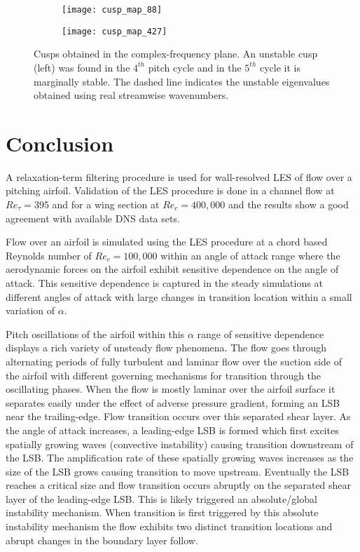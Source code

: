 \begin{figure}
	\centering
	\begin{subfigure}[t]{0.48\textwidth}
		\centering
		\texttt{[image: cusp\_map\_88]}
	\end{subfigure}
	\begin{subfigure}[t]{0.48\textwidth}
		\centering
		\texttt{[image: cusp\_map\_427]}
	\end{subfigure}
	\caption{Cusps obtained in the complex-frequency plane. An unstable cusp (left) was found in the $4^{th}$ pitch cycle and in the $5^{th}$ cycle it is marginally stable. The dashed line indicates the unstable eigenvalues obtained using real streamwise wavenumbers.}
	\label{fig:bubble_cusps}
\end{figure}

\section{Conclusion}

A relaxation-term filtering procedure is used for wall-resolved LES of flow over a pitching airfoil. Validation of the LES procedure is done in a channel flow at $Re_{\tau}=395$ and for a wing section at $Re_{c}=400,000$ and the results show a good agreement with available DNS data sets.

Flow over an airfoil is simulated using the LES procedure at a chord based Reynolds number of $Re_{c}=100,000$ within an angle of attack range where the aerodynamic forces on the airfoil exhibit sensitive dependence on the angle of attack. This sensitive dependence is captured in the steady simulations at different angles of attack with large changes in transition location within a small variation of $\alpha$.

Pitch oscillations of the airfoil within this $\alpha$ range of sensitive dependence displays a rich variety of unsteady flow phenomena. The flow goes through alternating periods of fully turbulent and laminar flow over the suction side of the airfoil with different governing mechanisms for transition through the oscillating phases. When the flow is mostly laminar over the airfoil surface it separates easily under the effect of adverse pressure gradient, forming an LSB near the trailing-edge. Flow transition occurs over this separated shear layer. As the angle of attack increases, a leading-edge LSB is formed which first excites spatially growing waves (convective instability) causing transition downstream of the LSB. The amplification rate of these spatially growing waves increases as the size of the LSB grows causing transition to move upstream. Eventually the LSB reaches a critical size and flow transition occurs abruptly on the separated shear layer of the leading-edge LSB. This is likely triggered an absolute/global instability mechanism. When transition is first triggered by this absolute instability mechanism the flow exhibits two distinct transition locations and abrupt changes in the boundary layer follow.

